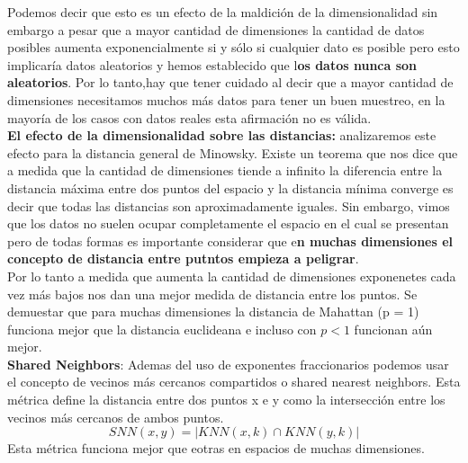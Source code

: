\documentclass[titlepage,a4paper]{article}
\begin{document}
Podemos decir que esto es un efecto de la maldición de la dimensionalidad sin embargo a pesar que a mayor cantidad de dimensiones la cantidad de datos posibles aumenta exponencialmente si y sólo si cualquier dato  es posible pero esto implicaría datos aleatorios y hemos establecido que l\textbf{os datos nunca son aleatorios}. Por lo tanto,hay que tener cuidado al decir que a mayor cantidad de dimensiones  necesitamos muchos más datos para tener un buen muestreo, en la mayoría de los casos con datos reales esta afirmación no es válida. \\

\textbf{El efecto de la dimensionalidad sobre las distancias:} analizaremos este efecto para la distancia general de Minowsky. Existe un teorema que nos dice que a medida que la cantidad de dimensiones tiende a infinito la diferencia entre la distancia máxima entre dos puntos del espacio y la distancia mínima converge es decir que todas las distancias son aproximadamente iguales. Sin embargo, vimos que los datos no suelen ocupar completamente el espacio en el cual se presentan pero de todas formas es importante considerar que e\textbf{n muchas dimensiones el concepto de distancia entre putntos empieza a peligrar}. \\

Por lo tanto a medida que aumenta la cantidad de dimensiones exponenetes cada vez más bajos nos dan una mejor medida de distancia entre los puntos. Se demuestar que para muchas dimensiones la distancia de Mahattan (p = 1) funciona mejor que la distancia euclideana e incluso con  $p < 1$ funcionan aún mejor. \\

\textbf{Shared Neighbors}: Ademas del uso de exponentes fraccionarios  podemos usar el concepto de vecinos más cercanos compartidos o shared nearest neighbors. Esta métrica define la distancia entre dos puntos x e y como la intersección entre los vecinos más cercanos de ambos puntos. $$SNN(x,y) = |KNN(x,k)\cap KNN(y,k)|$$ Esta métrica funciona mejor que eotras en espacios de muchas dimensiones. 
 
\end{document}
